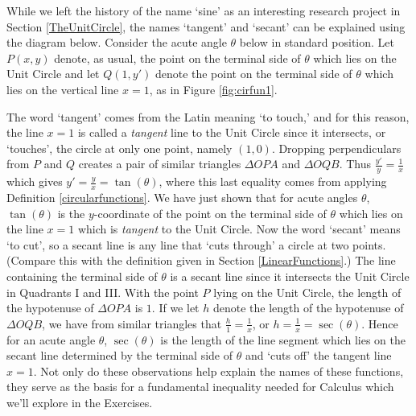 \smallskip

While we left the history of the name `sine' as an interesting research project in Section \ref{TheUnitCircle}, the names `tangent' and `secant' can be explained using the diagram below.  Consider the acute angle $\theta$ below in standard position. Let $P(x,y)$ denote, as usual,  the point on the terminal side of $\theta$ which lies on the Unit Circle and let $Q(1,y')$ denote the point on the terminal side of $\theta$ which lies on the vertical line $x=1$, as in Figure \ref{fig:cirfun1}. 



The word `tangent' comes from the Latin meaning `to touch,' and for this reason, the line $x=1$ is called a \textit{tangent} line to the Unit Circle since it intersects, or `touches', the circle at only one point, namely $(1,0)$.  Dropping perpendiculars from $P$ and $Q$ creates a pair of similar triangles $\Delta OPA$ and $\Delta OQB$.  Thus $\frac{y'}{y} = \frac{1}{x}$ which gives  $y' = \frac{y}{x} = \tan(\theta)$, where this last equality comes from applying Definition  \ref{circularfunctions}. We have just shown that for acute angles $\theta$, $\tan(\theta)$ is the $y$-coordinate of the point on the terminal side of $\theta$ which lies on the line $x = 1$ which is \textit{tangent} to the Unit Circle. Now the word `secant' means `to cut', so a secant line is any line that `cuts through' a circle at two points. (Compare this with the definition given in Section \ref{LinearFunctions}.)  The line containing the terminal side of $\theta$ is a secant line since it intersects the Unit Circle in Quadrants I and III.   With the point $P$ lying on the Unit Circle, the length of the hypotenuse of $\Delta OPA$ is $1$. If we let $h$ denote the length of the hypotenuse of $\Delta OQB$, we have from similar triangles that $\frac{h}{1} = \frac{1}{x}$, or $h = \frac{1}{x} = \sec(\theta)$.  Hence for an acute angle $\theta$, $\sec(\theta)$ is the length of the line segment which lies on the secant line determined by the terminal side of $\theta$ and `cuts off' the tangent line $x=1$.  Not only do these observations help explain the names of these functions, they serve as the basis for a fundamental inequality needed for Calculus which we'll explore in the Exercises.

\smallskip 

